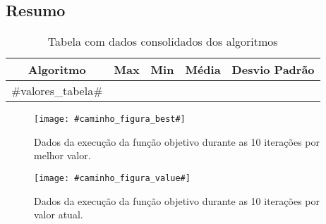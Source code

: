 \subsection{Resumo}

\begin{table}[h!]
\centering
\begin{tabular}{ |c|c|c|c|c|  }
\hline
\rowcolor{lightgray}
Algoritmo & Max & Min & Média & Desvio Padrão \\
\hline
#valores_tabela#
\end{tabular}
\caption{Tabela com dados consolidados dos algoritmos}
\end{table}

\begin{figure}[H]
\centering
  \begin{minipage}[b]{0.48\textwidth}
    \texttt{[image: \#caminho\_figura\_best\#]}
    \caption{Dados da execução da função objetivo durante as 10 iterações por melhor valor.
    \label{fig:#rotulo_figura_best#}}
  \end{minipage}
  \hfill
  \begin{minipage}[b]{0.48\textwidth}
    \texttt{[image: \#caminho\_figura\_value\#]}
    \caption{Dados da execução da função objetivo durante as 10 iterações por valor atual.
    \label{fig:#rotulo_figura_value#}}
  \end{minipage}
\end{figure}